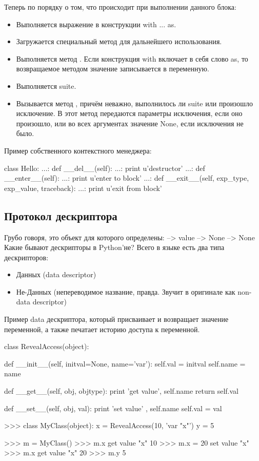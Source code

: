 	Теперь по порядку о том, что происходит при выполнении данного блока:
	\begin{itemize}
		\item Выполняется выражение в конструкции with ... as.
		\item Загружается специальный метод  для дальнейшего использования.
		\item Выполняется метод . Если конструкция with включает в себя слово as, то возвращаемое методом  значение записывается в переменную.
		\item Выполняется suite.
		\item Вызывается метод , причём неважно, выполнилось ли suite или произошло исключение. В этот метод передаются параметры исключения, если оно произошло, или во всех аргументах значение None, если исключения не было.
	\end{itemize}
	
	Пример собственного контекстного менеджера:
	\begin{python}
			class Hello:
	   ...:     def __del__(self):
	   ...:         print u'destructor'
	   ...:     def __enter__(self):
	   ...:         print u'enter to block'
	   ...:     def __exit__(self, exp_type, exp_value, traceback):
	   ...:         print u'exit from block'
	\end{python}

\subsection{Протокол дескриптора}	

Грубо говоря, это объект для которого определены:
 --> value
 --> None
 --> None
Какие бывают дескрипторы в Python'не?
Всего в языке есть два типа дескрипторов:
\begin{itemize}
	\item Данных (data descriptor)
	\item Не-Данных (непереводимое название, правда. Звучит в оригинале как non-data descriptor)
\end{itemize}


Пример data дескриптора, который присваивает и возвращает значение переменной, а также печатает историю доступа к переменной.

	\begin{python}
class RevealAccess(object):

    def __init__(self, initval=None, name='var'):
        self.val = initval
        self.name = name

    def __get__(self, obj, objtype):
        print 'get value', self.name
        return self.val

    def __set__(self, obj, val):
        print 'set value' , self.name
        self.val = val

>>> class MyClass(object):
    x = RevealAccess(10, 'var "x"')
    y = 5

>>> m = MyClass()
>>> m.x
get value "x"
10
>>> m.x = 20
set value "x"
>>> m.x
get value "x"
20
>>> m.y
5
\end{python}

